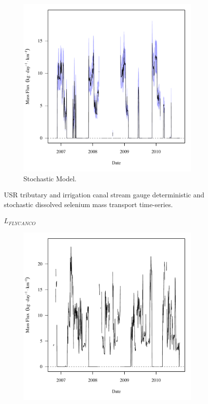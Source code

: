 \begin{linenumbers}
\begin{landscape}
\begin{figure}
\begin{subfigure}{0.7\textwidth}
			\includegraphics[width=\tableCustomSize]{"Figures/Results_USR/Stochastic/f FLS"}
			\caption{Stochastic Model.}
		\end{subfigure}
		\caption{USR tributary and irrigation canal stream gauge deterministic and stochastic dissolved selenium mass transport time-series.}
	\end{figure}
\end{landscape}
\subfiguremid
\begin{landscape}
	\begin{figure}
		$ \displaystyle L_{FLYCANCO} $
		\begin{subfigure}{0.7\textwidth}
			\centering
			\includegraphics[width=\tableCustomSize]{"Figures/Results_USR/Deterministic/f FLY"}

\end{subfigure}
\end{figure}
\end{landscape}
\end{linenumbers}
